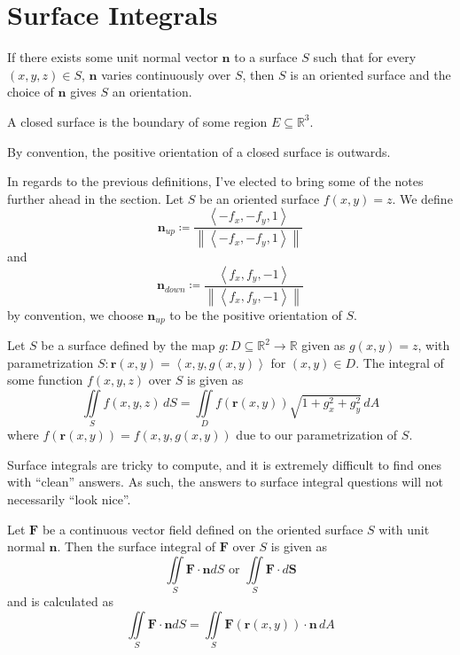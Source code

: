 \section{Surface Integrals}
\begin{definition}
    If there exists some unit normal vector \(\mathbf{n}\) to a surface \(S\) such that for every \((x,y,z)\in S\), \(\mathbf{n}\) varies continuously over \(S\), then \(S\) is an oriented surface and the choice of \(\mathbf{n}\) gives \(S\) an orientation.
\end{definition}
\begin{definition}
    A closed surface is the boundary of some region \(E\subseteq \mathbb{R}^3\).
\end{definition}
\begin{definition}
    By convention, the positive orientation of a closed surface is outwards.
\end{definition}
In regards to the previous definitions, I've elected to bring some of the notes further ahead in the section. Let \(S\) be an oriented surface \(f(x,y)=z\). We define
\[
    \mathbf{n}_{up} \coloneqq \frac{\left\langle -f_x,-f_y,1 \right\rangle }{\left\lVert \left\langle -f_x,-f_y,1 \right\rangle \right\rVert }
\]
and
\[
    \mathbf{n}_{down} \coloneqq \frac{\left\langle f_x,f_y,-1 \right\rangle }{\left\lVert \left\langle f_x,f_y,-1 \right\rangle \right\rVert }
\]
by convention, we choose \(\mathbf{n}_{up}  \) to be the positive orientation of \(S\).
\begin{theorem}
    Let \(S\) be a surface defined by the map \(g:D\subseteq \mathbb{R}^2\to \mathbb{R}\) given as \(g(x,y)=z\), with parametrization \(S:\mathbf{r}(x,y)=\left\langle x,y,g(x,y) \right\rangle \) for \((x,y)\in D\). The integral of some function \(f(x,y,z)\) over \(S\) is given as 
    \[
        \iint\limits_{S}f(x,y,z)\,dS = \iint\limits_{D}f(\mathbf{r}(x,y))\sqrt{1+g_x^2 +g_y^2}\,dA
    \]
    where \(f(\mathbf{r}(x,y))=f(x,y,g(x,y))\) due to our parametrization of \(S\).
\end{theorem}
\begin{remark}
    Surface integrals are tricky to compute, and it is extremely difficult to find ones with ``clean'' answers. As such, the answers to surface integral questions will not necessarily ``look nice''.
\end{remark}
\begin{theorem}
    Let \(\mathbf{F}\) be a continuous vector field defined on the oriented surface \(S\) with unit normal \(\mathbf{n}\). Then the surface integral of \(\mathbf{F}\) over \(S\) is given as 
    \[
        \iint\limits_{S}\mathbf{F}\cdot \mathbf{n}dS \text{ or }  \iint\limits_{S}\mathbf{F}\cdot d \mathbf{S}
    \]
    and is calculated as 
    \[
        \iint\limits_{S}\mathbf{F}\cdot \mathbf{n}dS = \iint\limits_{S}\mathbf{F}(\mathbf{r}(x,y))\cdot \mathbf{n}\,dA
    \]
\end{theorem}
